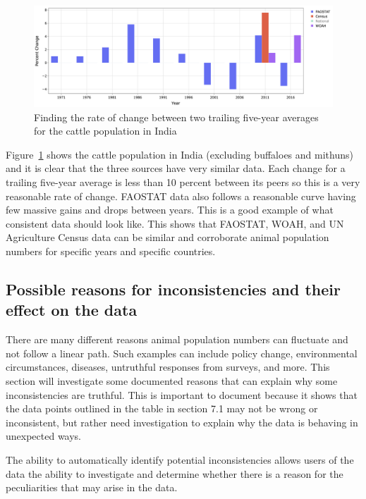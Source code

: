 \documentclass{article}
\begin{document}
\begin{figure}[h!]
    \centering
    \includegraphics[width=1\textwidth]{image14}
    \caption{Finding the rate of change between two trailing five-year averages for the cattle population in India}
    \label{fig:image14}
\end{figure}

Figure~\ref{fig:image14} shows the cattle population in India (excluding buffaloes and mithuns) and it is clear that the three sources have very similar data. Each change for a trailing five-year average is less than 10 percent between its peers so this is a very reasonable rate of change. FAOSTAT data also follows a reasonable curve having few massive gains and drops between years. This is a good example of what consistent data should look like. This shows that FAOSTAT, WOAH, and UN Agriculture Census data can be similar and corroborate animal population numbers for specific years and specific countries. 

\subsection{Possible reasons for inconsistencies and their effect on the data}

There are many different reasons animal population numbers can fluctuate and not follow a linear path. Such examples can include policy change, environmental circumstances, diseases, untruthful responses from surveys, and more. This section will investigate some documented reasons that can explain why some inconsistencies are truthful. This is important to document because it shows that the data points outlined in the table in section 7.1 may not be wrong or inconsistent, but rather need investigation to explain why the data is behaving in unexpected ways.

The ability to automatically identify potential inconsistencies allows users of the data the ability to investigate and determine whether there is a reason for the peculiarities that may arise in the data.
\end{document}
